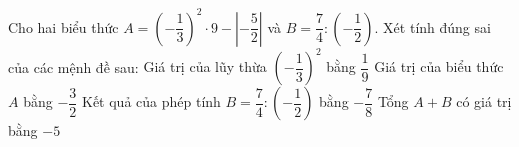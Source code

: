 \documentclass[12pt,a4paper]{article}
\begin{document}
\vspace{1mm}
\begin{ex}
Cho hai biểu thức $A = \left(-\dfrac{1}{3}\right)^2 \cdot 9 - \left|-\dfrac{5}{2}\right|$ và $B = \dfrac{7}{4} : \left(-\dfrac{1}{2}\right)$. Xét tính đúng sai của các mệnh đề sau:
\choiceTF
{\True Giá trị của lũy thừa $\left(-\dfrac{1}{3}\right)^2$ bằng $\dfrac{1}{9}$}
{\True Giá trị của biểu thức $A$ bằng $-\dfrac{3}{2}$}
{Kết quả của phép tính $B = \dfrac{7}{4} : \left(-\dfrac{1}{2}\right)$ bằng $-\dfrac{7}{8}$}
{\True Tổng $A + B$ có giá trị bằng $-5$}
\end{ex}
\end{document}
